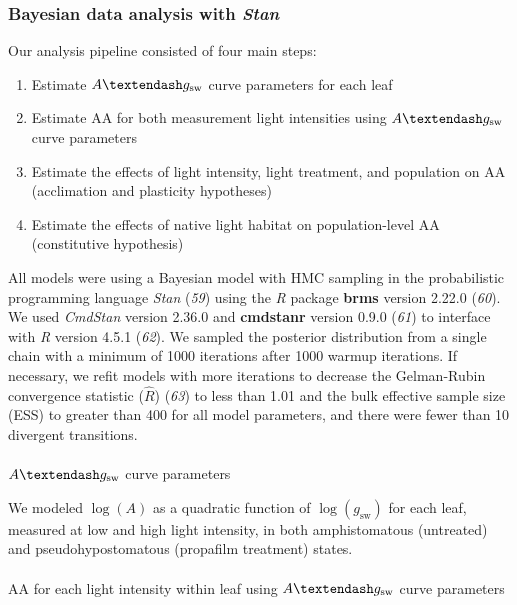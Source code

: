 \documentclass[
  letterpaper,
  DIV=11,
  numbers=noendperiod]{scrartcl}
\makeatletter
\let\oldparagraph\paragraph
\renewcommand{\paragraph}{
    \@ifstar
      \xxxParagraphStar
      \xxxParagraphNoStar
  }
\newcommand{\xxxParagraphStar}[1]{\oldparagraph*{#1}\mbox{}}
\newcommand{\xxxParagraphNoStar}[1]{\oldparagraph{#1}\mbox{}}
\providecommand{\tightlist}{%
  \setlength{\itemsep}{0pt}\setlength{\parskip}{0pt}}\usepackage{longtable,booktabs,array}
\newcommand{\aax}{$\mathrm{AA}$}
\newcommand{\agcurve}{$A \textendash g_\text{sw}$}
\newcommand{\loggsw}{$\log(g_\text{sw})$}
\newcommand{\logA}{$\log(A)$}
\makeatother
\begin{document}
\subsubsection{\texorpdfstring{Bayesian data analysis with
\emph{Stan}}{Bayesian data analysis with Stan}}\label{sec-analysis}

Our analysis pipeline consisted of four main steps:

\begin{enumerate}
\def\labelenumi{\arabic{enumi}.}
\tightlist
\item
  Estimate \agcurve{} curve parameters for each leaf
\item
  Estimate \aax{} for both measurement light intensities using
  \agcurve{} curve parameters
\item
  Estimate the effects of light intensity, light treatment, and
  population on \aax{} (acclimation and plasticity hypotheses)
\item
  Estimate the effects of native light habitat on population-level
  \aax{} (constitutive hypothesis)
\end{enumerate}

All models were using a Bayesian model with HMC sampling in the
probabilistic programming language \emph{Stan} (\emph{59}) using the
\emph{R} package \textbf{brms} version 2.22.0 (\emph{60}). We used
\emph{CmdStan} version 2.36.0 and \textbf{cmdstanr} version 0.9.0
(\emph{61}) to interface with \emph{R} version 4.5.1 (\emph{62}). We
sampled the posterior distribution from a single chain with a minimum of
1000 iterations after 1000 warmup iterations. If necessary, we refit
models with more iterations to decrease the Gelman-Rubin convergence
statistic (\(\hat{R}\)) (\emph{63}) to less than 1.01 and the bulk
effective sample size (ESS) to greater than 400 for all model
parameters, and there were fewer than 10 divergent transitions.

\paragraph{\texorpdfstring{\agcurve{} curve
parameters}{ curve parameters}}\label{sec-agcurve-pars}

We modeled \logA{} as a quadratic function of \loggsw{} for each leaf,
measured at low and high light intensity, in both amphistomatous
(untreated) and pseudohypostomatous (propafilm treatment) states.

\paragraph{\texorpdfstring{\aax{} for each light intensity within leaf
using \agcurve{} curve
parameters}{ for each light intensity within leaf using  curve parameters}}\label{sec-aa-est}
\end{document}
